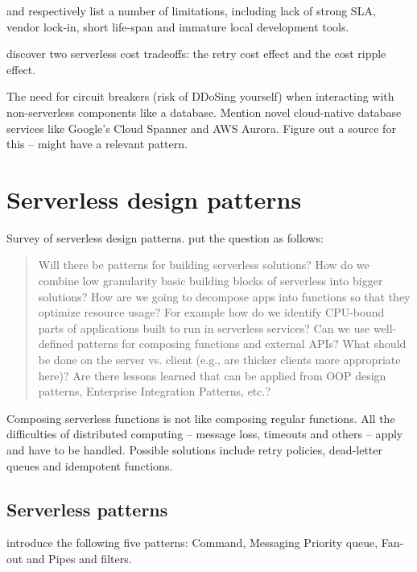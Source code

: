 \documentclass[utf8,english]{gradu3}
\begin{document}
\textcite{robert2016serverlessarchitectures} and \textcite{adzic2017serverless} respectively list a number of limitations, including lack of strong SLA, vendor lock-in, short life-span and immature local development tools.

\textcite{kuhlenkamp17costradamus} discover two serverless cost tradeoffs: the retry cost effect and the cost ripple effect.

The need for circuit breakers (risk of DDoSing yourself) when interacting with non-serverless components like a database. Mention novel cloud-native database services like Google's Cloud Spanner and AWS Aurora. Figure out a source for this -- \textcite{hohpe2004enterprise} might have a relevant pattern.

\chapter{Serverless design patterns}

Survey of serverless design patterns. \textcite{baldini17currentTrends} put the question as follows:

\begin{quote}
Will there be patterns for building serverless solutions? How do we combine low granularity basic building blocks of serverless into bigger solutions? How are we going to decompose apps into functions so that they optimize resource usage? For example how do we identify CPU-bound parts of applications built to run in serverless services? Can we use well-defined patterns for composing functions and external APIs? What should be done on the server vs. client (e.g., are thicker clients more appropriate here)? Are there lessons learned that can be applied from OOP design patterns, Enterprise Integration Patterns, etc.?
\end{quote}

Composing serverless functions is not like composing regular functions. All the difficulties of distributed computing -- message loss, timeouts and others -- apply and have to be handled. Possible solutions include retry policies, dead-letter queues and idempotent functions.

\section{Serverless patterns}

\textcite{sbarski2017serverless} introduce the following five patterns: Command, Messaging Priority queue, Fan-out and Pipes and filters.
\end{document}
